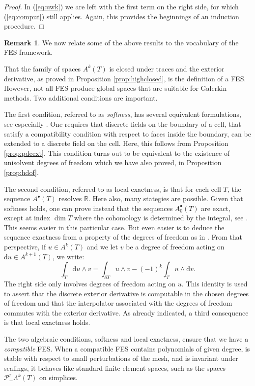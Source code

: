 \documentclass[10pt,a4paper]{article}
\newcommand{\rmd}{\mathrm{d}}
\newcommand{\bbR}{\mathbb{R}}
\newcommand{\calP}{\mathcal{P}}
\newcommand{\bs}{{\scriptscriptstyle{\bullet}}}
\newcommand{\Poly}{\calP}
\newcommand{\Pminus}{\Poly_{\!\!-}}
\theoremstyle{remark}
\theoremstyle{definition}
\newtheorem{remark}{Remark}[section]
\numberwithin{equation}{section}
\begin{document}
\begin{proof}
  In (\ref{eq:uwk}) we are left with the first term on the right side, for which (\ref{eq:comput}) still applies. Again, this provides the beginnings of an induction procedure. 
\end{proof}


\begin{remark} We now relate some of the above results to the vocabulary of the FES framework.

  That the family of spaces $A^k(T)$ is closed under traces and the exterior derivative, as proved in Proposition \ref{prop:highclosed}, is the definition of a FES. However, not all FES produce global spaces that are suitable for Galerkin methods. Two additional conditions are important.

  The first condition, referred to as \emph{softness}, has several equivalent formulations, see especially \cite[Propositions 2.5 and 2.6]{ChrRap16}. One requires that discrete fields on the boundary of a cell, that satisfy a compatibility condition with respect to faces inside the boundary, can be extended to a discrete field on the cell. Here, this follows from Proposition \ref{prop:pdeext}. This condition turns out to be equivalent to the existence of unisolvent degrees of freedom which we have also proved, in Proposition \ref{prop:hdof}.

  The second condition, referred to as local exactness, is that for each cell $T$, the sequence $A^\bs(T)$ resolves $\bbR$. Here also, many stategies are possible. Given that softness holds, one can prove instead that the sequences $A^\bs_0(T)$ are exact, except at index $\dim T$ where the cohomology is determined by the integral, see \cite[Proposition 2.3]{ChrRap16}. This seems easier in this particular case. But even easier is to deduce the sequence exactness from a property of the degrees of freedom as in \cite[Proposition 2.7 and 2.8]{ChrRap16}. From that perspective, if $u\in A^k(T)$ and we let $v$ be a degree of freedom acting on $\rmd u \in A^{k+1}(T)$, we write:
  \begin{equation}
    \int_T \rmd u \wedge v = \int_{\partial T} u \wedge v - (-1)^k \int_T u \wedge \rmd v.
  \end{equation}
  The right side only involves degrees of freedom acting on $u$. This identity is used to assert that the discrete exterior derivative is computable in the chosen degrees of freedom and that the interpolator associated with the degrees of freedom commutes with the exterior derivative. As already indicated, a third consequence is that local exactness holds.

  The two algebraic conditions, softness and local exactness, ensure that we have a \emph{compatible} FES. When a compatible FES contains polynomials of given degree, is stable with respect to small perturbations of the mesh, and is invariant under scalings, it behaves like standard finite element spaces, such as the spaces $\Pminus^r \Lambda^k(T)$ on simplices.
\end{remark}
\end{document}
